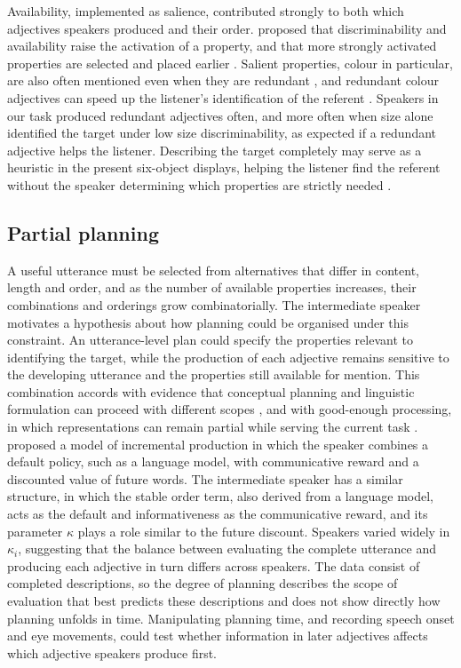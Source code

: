 \documentclass[10pt,a4paper,fleqn]{article}
\begin{document}
Availability, implemented as salience, contributed strongly to both which adjectives speakers produced and their order.
\citet{fukumura2018ordering} proposed that discriminability and availability raise the activation of a property, and that more strongly activated properties are selected and placed earlier \citep[p.~47]{fukumura2018ordering}.
Salient properties, colour in particular, are also often mentioned even when they are redundant \citep{rubio2016redundant,degen2020redundancy}, and redundant colour adjectives can speed up the listener's identification of the referent \citep[p.~4]{rubio2016redundant}.
Speakers in our task produced redundant adjectives often, and more often when size alone identified the target under low size discriminability, as expected if a redundant adjective helps the listener.
Describing the target completely may serve as a heuristic in the present six-object displays, helping the listener find the referent without the speaker determining which properties are strictly needed \citep[p.~7]{rubio2019overinformative}.

\subsection{Partial planning}

A useful utterance must be selected from alternatives that differ in content, length and order, and as the number of available properties increases, their combinations and orderings grow combinatorially.
The intermediate speaker motivates a hypothesis about how planning could be organised under this constraint.
An utterance-level plan could specify the properties relevant to identifying the target, while the production of each adjective remains sensitive to the developing utterance and the properties still available for mention.
This combination accords with evidence that conceptual planning and linguistic formulation can proceed with different scopes \citep{griffin2000eyes,ferreira2002incremental,konopka2014priming}, and with good-enough processing, in which representations can remain partial while serving the current task \citep{ferreira2002goodenough}.
\citet{futrell2023information} proposed a model of incremental production in which the speaker combines a default policy, such as a language model, with communicative reward and a discounted value of future words.
The intermediate speaker has a similar structure, in which the stable order term, also derived from a language model, acts as the default and informativeness as the communicative reward, and its parameter $\kappa$ plays a role similar to the future discount.
Speakers varied widely in $\kappa_i$, suggesting that the balance between evaluating the complete utterance and producing each adjective in turn differs across speakers.
The data consist of completed descriptions, so the degree of planning describes the scope of evaluation that best predicts these descriptions and does not show directly how planning unfolds in time.
Manipulating planning time, and recording speech onset and eye movements, could test whether information in later adjectives affects which adjective speakers produce first.
\end{document}
